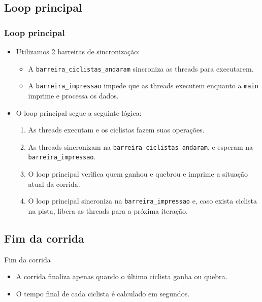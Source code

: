 \documentclass{beamer}
\begin{document}
\subsection{Loop principal}
\begin{frame}
  \frametitle{Loop principal}
  \begin{itemize}
    \item Utilizamos 2 barreiras de sincronização:
    \begin{itemize}
      \item A \texttt{barreira\_ciclistas\_andaram} sincroniza as threads para executarem.
      \item A \texttt{barreira\_impressao} impede que as threads executem enquanto a \texttt{main} imprime e processa os dados.
    \end{itemize}
    \item O loop principal segue a seguinte lógica:
    \begin{enumerate}
      \item As threads executam e os ciclistas fazem suas operações.
      \item As threads sincronizam na \texttt{barreira\_ciclistas\_andaram}, e esperam na \texttt{barreira\_impressao}.
      \item O loop principal verifica quem ganhou e quebrou e imprime a situação atual da corrida.
      \item O loop principal sincroniza na \texttt{barreira\_impressao} e, caso exista ciclista na pista, libera as threads para a próxima iteração.
    \end{enumerate}
  \end{itemize}
\end{frame}

\subsection{Fim da corrida}
\begin{frame}{Fim da corrida}
  \begin{itemize}
    \item A corrida finaliza apenas quando o último ciclista ganha ou quebra.
    \item O tempo final de cada ciclista é calculado em segundos.
  \end{itemize}
\end{frame}
\end{document}
